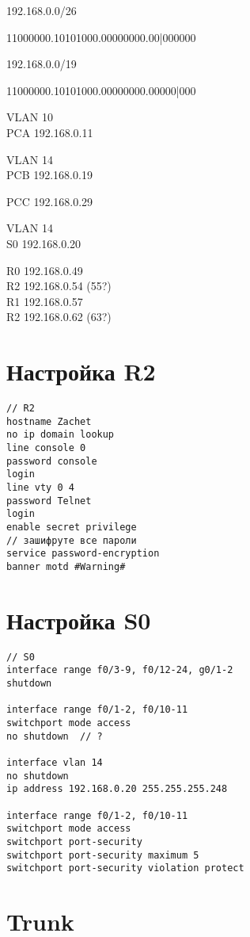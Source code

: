 192.168.0.0/26

11000000.10101000.00000000.00|000000

192.168.0.0/19

11000000.10101000.00000000.00000|000

VLAN 10\\
PCA 192.168.0.11

VLAN 14\\
PCB 192.168.0.19

PCC 192.168.0.29

VLAN 14\\
S0 192.168.0.20

R0 192.168.0.49\\
R2 192.168.0.54 (55?)\\

R1 192.168.0.57\\
R2 192.168.0.62 (63?)\\


\section{Настройка R2}

\begin{verbatim}
// R2
hostname Zachet
no ip domain lookup
line console 0
password console
login
line vty 0 4
password Telnet
login
enable secret privilege
// зашифруте все пароли
service password-encryption
banner motd #Warning#
\end{verbatim}

\section{Настройка S0}

\begin{verbatim}
// S0
interface range f0/3-9, f0/12-24, g0/1-2
shutdown

interface range f0/1-2, f0/10-11
switchport mode access
no shutdown  // ?

interface vlan 14
no shutdown
ip address 192.168.0.20 255.255.255.248

interface range f0/1-2, f0/10-11
switchport mode access
switchport port-security
switchport port-security maximum 5
switchport port-security violation protect
\end{verbatim}

\section{Trunk}

